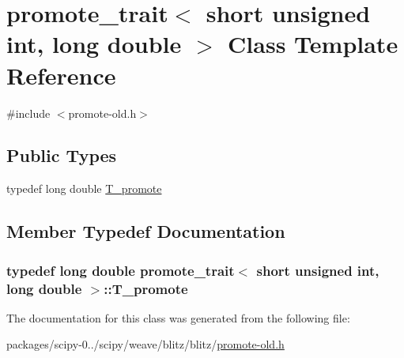 \hypertarget{classpromote__trait_3_01short_01unsigned_01int_00_01long_01double_01_4}{}\section{promote\+\_\+trait$<$ short unsigned int, long double $>$ Class Template Reference}
\label{classpromote__trait_3_01short_01unsigned_01int_00_01long_01double_01_4}


{\ttfamily \#include $<$promote-\/old.\+h$>$}

\subsection*{Public Types}
\begin{DoxyCompactItemize}
\item 
typedef long double \hyperlink{classpromote__trait_3_01short_01unsigned_01int_00_01long_01double_01_4_a86e2a64e4b02445e17b95bc882426144}{T\+\_\+promote}
\end{DoxyCompactItemize}


\subsection{Member Typedef Documentation}
\hypertarget{classpromote__trait_3_01short_01unsigned_01int_00_01long_01double_01_4_a86e2a64e4b02445e17b95bc882426144}{}
\subsubsection[{T\+\_\+promote}]{\setlength{\rightskip}{0pt plus 5cm}typedef long double {\bf promote\+\_\+trait}$<$ short unsigned int, long double $>$\+::{\bf T\+\_\+promote}}\label{classpromote__trait_3_01short_01unsigned_01int_00_01long_01double_01_4_a86e2a64e4b02445e17b95bc882426144}


The documentation for this class was generated from the following file\+:\begin{DoxyCompactItemize}
\item 
packages/scipy-\/0../scipy/weave/blitz/blitz/\hyperlink{promote-old_8h}{promote-\/old.\+h}\end{DoxyCompactItemize}
